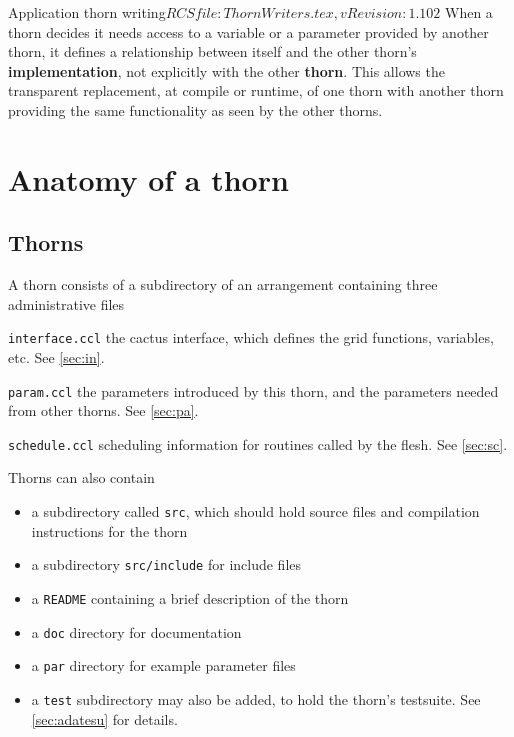 \begin{cactuspart}{2}{Application thorn writing}{$RCSfile: ThornWriters.tex,v $}{$Revision: 1.102 $}
When a thorn decides it needs access to a variable or a parameter provided by
another thorn, it defines a relationship between itself and the other thorn's
{\bf implementation}, not explicitly with the other {\bf thorn}.
This allows the transparent replacement, at compile or runtime, of one
thorn with another thorn providing the same functionality as seen by
the other thorns.




\chapter{Anatomy of a thorn}
\label{sec:anofath}

\section{Thorns}
\label{sec:th}

A thorn consists of a subdirectory of an arrangement containing three
administrative files

\begin{Lentry}
\item[{\tt interface.ccl}] the cactus interface, which defines the grid
functions, variables, etc. See \ref{sec:in}.
\item[{\tt param.ccl}] the parameters introduced by this thorn, and the
parameters needed from other thorns. See
\ref{sec:pa}.
\item[{\tt schedule.ccl}] scheduling information for routines called by
the flesh. See \ref{sec:sc}.
\end{Lentry}

Thorns can also contain
\begin{itemize}
\item a subdirectory called {\tt src}, which should hold source files
        and compilation instructions for the thorn
\item a subdirectory {\tt src/include} for include files
\item a {\tt README} containing a brief description of the thorn
\item a {\tt doc} directory for documentation
\item a {\tt par} directory for example parameter files
\item a {\tt test} subdirectory may also be added, to hold the thorn's
    testsuite. See \ref{sec:adatesu} for details.
\end{itemize}


\end{cactuspart}
